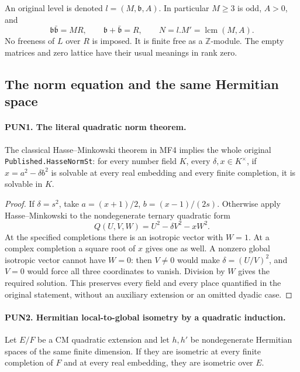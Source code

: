 \documentclass[11pt,a4paper]{article}
\numberwithin{equation}{section}
\theoremstyle{remark}\newtheorem{remark}[theorem]{Remark}
\begin{document}
An original level is denoted \(l=(M,\mathfrak b,A)\).  In particular
\(M\ge3\) is odd, \(A>0\), and
\[
 \mathfrak b\bar{\mathfrak b}=MR,\qquad
 \mathfrak b+\bar{\mathfrak b}=R,\qquad
                  N=l.M'=\operatorname{lcm}(M,A).
 \tag{PUN.2}
\]
No freeness of \(L\) over \(R\) is imposed.  It is finite free as a
\(\mathbb Z\)-module.  The empty matrices and zero lattice have their
usual meanings in rank zero.

\subsection{The norm equation and the same Hermitian space}

\paragraph{PUN1. The literal quadratic norm theorem.}
\label{claim:PUN1}
The classical Hasse--Minkowski theorem in MF4 implies the whole
original \texttt{Published.\allowbreak Hasse\allowbreak Norm\allowbreak St}: for every number field
\(K\), every \(\delta,x\in K^\times\), if
\(x=a^2-\delta b^2\) is solvable at every real embedding and every
finite completion, it is solvable in \(K\).

\begin{proof}
If \(\delta=s^2\), take
\(a=(x+1)/2\), \(b=(x-1)/(2s)\).  Otherwise apply
Hasse--Minkowski to the nondegenerate ternary quadratic form
\[
                  Q(U,V,W)=U^2-\delta V^2-xW^2.
 \tag{PUN.3}
\]
At the specified completions there is an isotropic vector with
\(W=1\).  At a complex completion a square root of \(x\) gives
one as well.  A nonzero global isotropic vector cannot have \(W=0\):
then \(V\ne0\) would make \(\delta=(U/V)^2\), and \(V=0\)
would force all three coordinates to vanish.  Division by \(W\)
gives the required solution.  This preserves every field and every
place quantified in the original statement, without an auxiliary
extension or an omitted dyadic case.
\end{proof}

\paragraph{PUN2. Hermitian local-to-global isometry by a quadratic induction.}
\label{claim:PUN2}
Let \(E/F\) be a CM quadratic extension and let \(h,h'\) be
nondegenerate Hermitian spaces of the same finite dimension.
If they are isometric at every finite completion of \(F\) and at
every real embedding, they are isometric over \(E\).
\end{document}
